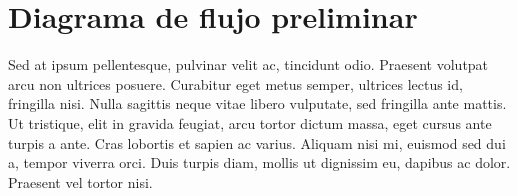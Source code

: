 \section{Diagrama de flujo preliminar}
\label{sec:diag_flujo}
Sed at ipsum pellentesque, pulvinar velit ac, tincidunt odio. Praesent volutpat arcu non ultrices posuere. Curabitur eget metus semper, ultrices lectus id, fringilla nisi. Nulla sagittis neque vitae libero vulputate, sed fringilla ante mattis. Ut tristique, elit in gravida feugiat, arcu tortor dictum massa, eget cursus ante turpis a ante. Cras lobortis et sapien ac varius. Aliquam nisi mi, euismod sed dui a, tempor viverra orci. Duis turpis diam, mollis ut dignissim eu, dapibus ac dolor. Praesent vel tortor nisi. 